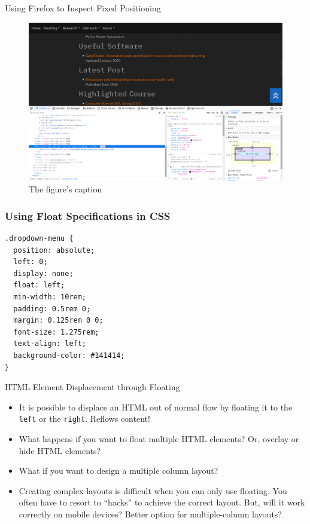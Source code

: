\documentclass[14pt,aspectratio=169]{beamer}
\begin{document}
%
\begin{frame}{Using Firefox to Inspect Fixed Positioning}
  \begin{figure}
    \centering
    \includegraphics[scale=.08]{images/fixed-firefox.png}
    \caption{The figure's caption}
  \end{figure}
\end{frame}

%
\begin{frame}[fragile]
  \frametitle{Using Float Specifications in CSS}
  \normalsize
  \begin{minipage}{6in}
    \vspace*{.1in}
    \begin{verbatim}
.dropdown-menu {
  position: absolute;
  left: 0;
  display: none;
  float: left;
  min-width: 10rem;
  padding: 0.5rem 0;
  margin: 0.125rem 0 0;
  font-size: 1.275rem;
  text-align: left;
  background-color: #141414;
}
    \end{verbatim}
  \end{minipage}
%
\end{frame}

%
\begin{frame}{HTML Element Displacement through Floating}
  \begin{itemize}
    \item It is possible to displace an HTML out of normal flow by floating it
      to the {\tt left} or the {\tt right}. Reflows content!
      \vspace*{-.15in}
    \item What happens if you want to float multiple HTML elements? Or, overlay
      or hide HTML elements?
      \vspace*{-.15in}
    \item What if you want to design a multiple column layout?
      \vspace*{-.15in}
    \item Creating complex layouts is difficult when you can only use floating.
      You often have to resort to ``hacks'' to achieve the correct layout. But,
      will it work correctly on mobile devices? Better option for
      multiple-column layouts?
  \end{itemize}
\end{frame}
\end{document}
